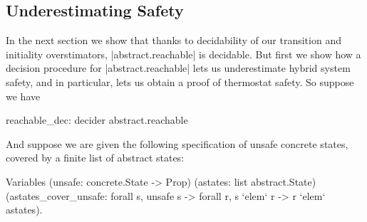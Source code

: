 \documentclass[runningheads]{llncs}
\begin{document}
{%
% 
% 
}

\subsection{Underestimating Safety}
\label{underestimatingsafety}

In the next section we show that thanks to decidability of our
transition and initiality overstimators, |abstract.reachable| is
decidable. But first we show how a
decision procedure for |abstract.reachable| lets us underestimate
hybrid system safety, and in particular, lets us obtain a proof of
thermostat safety. So suppose we have
\begin{code}
  reachable_dec: decider abstract.reachable
\end{code}
And suppose we are given the following specification of unsafe concrete states, covered by a finite list of abstract states:
\begin{code}
  Variables
    (unsafe: concrete.State -> Prop)
    (astates: list abstract.State)
    (astates_cover_unsafe: forall s, unsafe s -> forall r, s `elem` r -> r `elem` astates).
\end{code}
\end{document}
